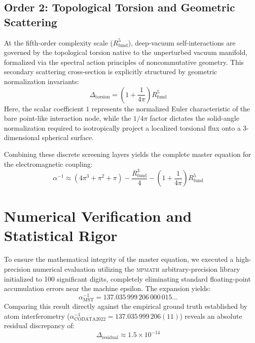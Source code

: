 \documentclass[12pt,a4paper]{article}
\begin{document}
\subsection{Order 2: Topological Torsion and Geometric Scattering}

At the fifth-order complexity scale ($R_{\text{fund}}^5$), deep-vacuum self-interactions are governed by the topological torsion native to the unperturbed vacuum manifold, formalized via the spectral action principles of noncommutative geometry. This secondary scattering cross-section is explicitly structured by geometric normalization invariants:
\begin{equation}
\Delta_{\text{torsion}} = \left(1 + \frac{1}{4\pi}\right) R_{\text{fund}}^5
\end{equation}
Here, the scalar coefficient $1$ represents the normalized Euler characteristic of the bare point-like interaction node, while the $1/4\pi$ factor dictates the solid-angle normalization required to isotropically project a localized torsional flux onto a 3-dimensional spherical surface.

Combining these discrete screening layers yields the complete master equation for the electromagnetic coupling:
\begin{equation}
\boxed{
\alpha^{-1} \approx (4\pi^3 + \pi^2 + \pi) - \frac{R_{\text{fund}}^3}{4} - \left(1 + \frac{1}{4\pi}\right)R_{\text{fund}}^5
}
\label{eq:master}
\end{equation}


\section{Numerical Verification and Statistical Rigor}

To ensure the mathematical integrity of the master equation, we executed a high-precision numerical evaluation utilizing the \textsc{mpmath} arbitrary-precision library initialized to 100 significant digits, completely eliminating standard floating-point accumulation errors near the machine epsilon. The expansion yields:
\begin{equation}
\alpha^{-1}_{\text{MST}} = 137.035\,999\,206\,000\,015\dots
\end{equation}
Comparing this result directly against the empirical ground truth established by atom interferometry ($\alpha^{-1}_{\text{CODATA2022}} = 137.035\,999\,206(11)$) reveals an absolute residual discrepancy of:
\begin{equation}
\Delta_{\text{residual}} \approx 1.5 \times 10^{-14}
\end{equation}
\end{document}
